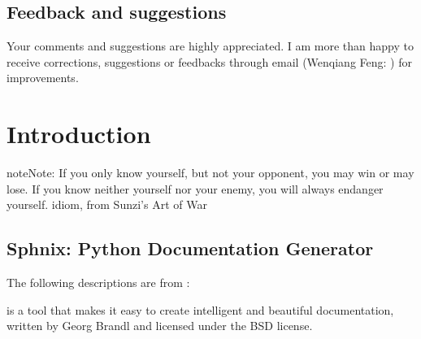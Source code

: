 \documentclass[letterpaper,12pt,english]{sphinxmanual}
\begin{document}
\section{Feedback and suggestions}
\label{\detokenize{preface:feedback-and-suggestions}}
Your comments and suggestions are highly appreciated. I am more than happy to receive
corrections, suggestions or feedbacks through email (Wenqiang Feng: ) for improvements.


\chapter{Introduction}
\label{\detokenize{intro:introduction}}\label{\detokenize{intro:intro}}\label{\detokenize{intro::doc}}
\begin{sphinxadmonition}{note}{Note:}
If you only know yourself, but not your opponent, you may win or may lose.
If you know neither yourself nor your enemy, you will always endanger yourself.
\textendash{} idiom, from Sunzi’s Art of War
\end{sphinxadmonition}


\section{Sphnix: Python Documentation Generator}
\label{\detokenize{intro:sphnix-python-documentation-generator}}
The following descriptions are from :

 is a tool that makes it easy to create intelligent and beautiful documentation, written by Georg Brandl and licensed under the BSD license.
\end{document}
